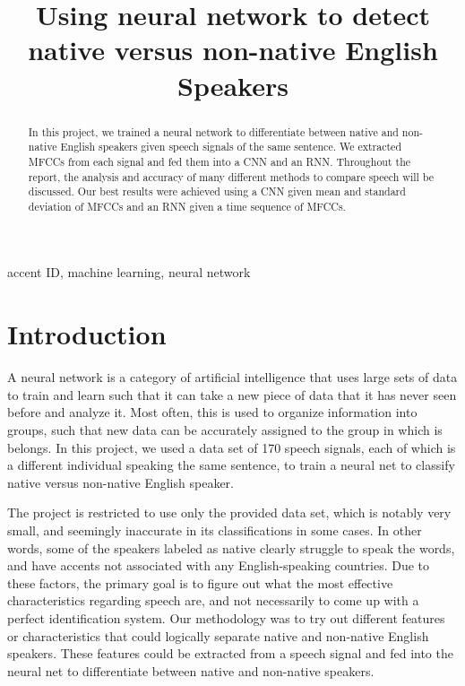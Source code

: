 \documentclass{article}
\title{Using neural network to detect native versus non-native English Speakers}
\begin{document}

\maketitle

\begin{abstract}
	In this project, we trained a neural network to differentiate between native and non-native English speakers given speech signals of the same sentence.
	We extracted MFCCs from each signal and fed them into a CNN and an RNN.
	Throughout the report, the analysis and accuracy of many different methods to compare speech will be discussed. 
	Our best results were achieved using a CNN given mean and standard deviation of MFCCs and an RNN given a time sequence of MFCCs.
\end{abstract}

\begin{keywords}
accent ID,
machine learning,
neural network
\end{keywords}

\section{Introduction}
\label{sec:intro}

A neural network is a category of artificial intelligence that uses large sets of data to train and learn such that it can take a new piece of data that it has never seen before and analyze it.
Most often, this is used to organize information into groups, such that new data can be accurately assigned to the group in which is belongs.
In this project, we used a data set of 170 speech signals, each of which is a different individual speaking the same sentence, to train a neural net to classify native versus non-native English speaker. 

The project is restricted to use only the provided data set, which is notably very small, and seemingly inaccurate in its classifications in some cases.
In other words,  some of the speakers labeled as native clearly struggle to speak the words, and have accents not associated with any English-speaking countries.
Due to these factors, the primary goal is to figure out what the most effective characteristics regarding speech are, and not necessarily to come up with a perfect identification system.
Our methodology was to try out different features or characteristics that could logically separate native and non-native English speakers.
These features could be extracted from a speech signal and fed into the neural net to differentiate between native and non-native speakers.
\end{document}
